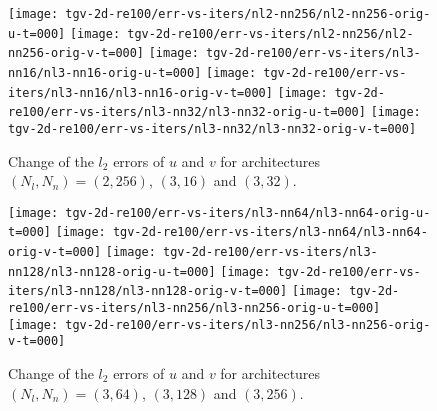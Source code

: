 \begin{figure}[H]
    \centering
    \texttt{[image: tgv-2d-re100/err-vs-iters/nl2-nn256/nl2-nn256-orig-u-t=000]}%
    \hfill%
    \texttt{[image: tgv-2d-re100/err-vs-iters/nl2-nn256/nl2-nn256-orig-v-t=000]}%
    \newline
    \vfill
    \texttt{[image: tgv-2d-re100/err-vs-iters/nl3-nn16/nl3-nn16-orig-u-t=000]}%
    \hfill
    \texttt{[image: tgv-2d-re100/err-vs-iters/nl3-nn16/nl3-nn16-orig-v-t=000]}%
    \newline
    \vfill
    \texttt{[image: tgv-2d-re100/err-vs-iters/nl3-nn32/nl3-nn32-orig-u-t=000]}%
    \hfill
    \texttt{[image: tgv-2d-re100/err-vs-iters/nl3-nn32/nl3-nn32-orig-v-t=000]}%
    \caption{Change of the $l_2$ errors of $u$ and $v$ for architectures $(N_l, N_n)=(2, 256)$, $(3, 16)$ and $(3, 32)$.}
\end{figure}

\begin{figure}[H]
    \centering
    \texttt{[image: tgv-2d-re100/err-vs-iters/nl3-nn64/nl3-nn64-orig-u-t=000]}%
    \hfill%
    \texttt{[image: tgv-2d-re100/err-vs-iters/nl3-nn64/nl3-nn64-orig-v-t=000]}%
    \newline
    \vfill
    \texttt{[image: tgv-2d-re100/err-vs-iters/nl3-nn128/nl3-nn128-orig-u-t=000]}%
    \hfill
    \texttt{[image: tgv-2d-re100/err-vs-iters/nl3-nn128/nl3-nn128-orig-v-t=000]}%
    \newline
    \vfill
    \texttt{[image: tgv-2d-re100/err-vs-iters/nl3-nn256/nl3-nn256-orig-u-t=000]}%
    \hfill
    \texttt{[image: tgv-2d-re100/err-vs-iters/nl3-nn256/nl3-nn256-orig-v-t=000]}%
    \caption{Change of the $l_2$ errors of $u$ and $v$ for architectures $(N_l, N_n)=(3, 64)$, $(3, 128)$ and $(3, 256)$.}
\end{figure}
